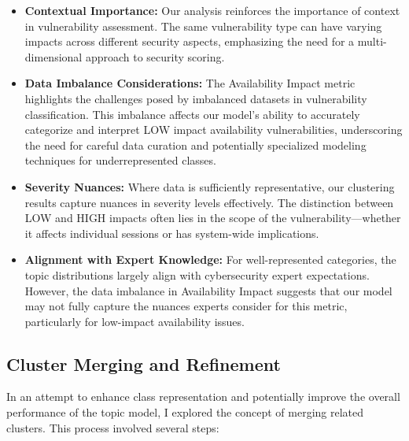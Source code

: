 \documentclass[12pt]{article}
\begin{document}
\begin{itemize}

	\item \textbf{Contextual Importance:} Our analysis reinforces the importance of context in
	      vulnerability assessment. The same vulnerability type can have varying impacts across
	      different security aspects, emphasizing the need for a multi-dimensional approach to
	      security scoring.

	\item \textbf{Data Imbalance Considerations:} The Availability Impact metric highlights the
	      challenges posed by imbalanced datasets in vulnerability classification. This imbalance
	      affects our model's ability to accurately categorize and interpret LOW impact availability
	      vulnerabilities, underscoring the need for careful data curation and potentially specialized
	      modeling techniques for underrepresented classes.

	\item \textbf{Severity Nuances:} Where data is sufficiently representative, our clustering
	      results capture nuances in severity levels effectively. The distinction between LOW and HIGH
	      impacts often lies in the scope of the vulnerability---whether it affects individual
	      sessions or has system-wide implications.

	\item \textbf{Alignment with Expert Knowledge:} For well-represented categories, the topic
	      distributions largely align with cybersecurity expert expectations. However, the data
	      imbalance in Availability Impact suggests that our model may not fully capture the nuances
	      experts consider for this metric, particularly for low-impact availability issues.

\end{itemize}

\subsection{Cluster Merging and Refinement}

In an attempt to enhance class representation and potentially improve the overall performance of the
topic model, I explored the concept of merging related clusters. This process involved several steps:
\end{document}
